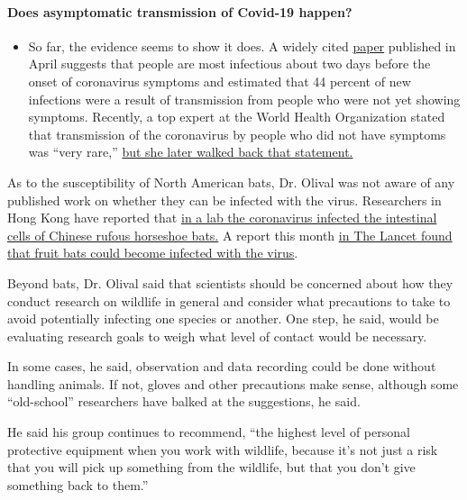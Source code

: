\begin{itemize}
{  \paragraph{Does asymptomatic transmission of Covid-19
  happen?}\label{does-asymptomatic-transmission-of-covid-19-happen}}

  \begin{itemize}
  \tightlist
  \item
    So far, the evidence seems to show it does. A widely cited
    \href{https://www.nature.com/articles/s41591-020-0869-5}{paper}
    published in April suggests that people are most infectious about
    two days before the onset of coronavirus symptoms and estimated that
    44 percent of new infections were a result of transmission from
    people who were not yet showing symptoms. Recently, a top expert at
    the World Health Organization stated that transmission of the
    coronavirus by people who did not have symptoms was ``very rare,''
    \href{https://www.nytimes.com/2020/06/09/world/coronavirus-updates.html?action=click\&pgtype=Article\&state=default\&region=MAIN_CONTENT_3\&context=storylines_faq\#link-1f302e21}{but
    she later walked back that statement.}
  \end{itemize}
\end{itemize}

As to the susceptibility of North American bats, Dr. Olival was not
aware of any published work on whether they can be infected with the
virus. Researchers in Hong Kong have reported that
\href{https://www.nature.com/articles/s41591-020-0912-6}{in a lab the
coronavirus infected the intestinal cells of Chinese rufous horseshoe
bats.} A report this month
\href{https://www.thelancet.com/journals/lanmic/article/PIIS2666-5247(20)30089-6/fulltext}{in
The Lancet found that fruit bats could become infected with the virus}.

Beyond bats, Dr. Olival said that scientists should be concerned about
how they conduct research on wildlife in general and consider what
precautions to take to avoid potentially infecting one species or
another. One step, he said, would be evaluating research goals to weigh
what level of contact would be necessary.

In some cases, he said, observation and data recording could be done
without handling animals. If not, gloves and other precautions make
sense, although some ``old-school'' researchers have balked at the
suggestions, he said.

He said his group continues to recommend, ``the highest level of
personal protective equipment when you work with wildlife, because it's
not just a risk that you will pick up something from the wildlife, but
that you don't give something back to them.''

